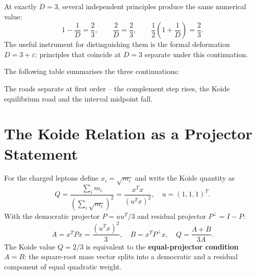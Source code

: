 At exactly \(D = 3\), several independent principles produce the same
numerical value:
\begin{equation}
  1 - \frac{1}{D} = \frac{2}{3}, \qquad
  \frac{2}{D} = \frac{2}{3}, \qquad
  \frac{1}{2}\!\left(1 + \frac{1}{D}\right) = \frac{2}{3}.
\end{equation}
The useful instrument for distinguishing them is the formal deformation
\(D = 3+\varepsilon\): principles that coincide at \(D = 3\) separate under
this continuation.

The following table summarises the three continuations:

\begin{center}
\renewcommand{\arraystretch}{1.5}
\end{center}

The roads separate at first order -- the complement step rises,
the Koide equilibrium road and the interval midpoint fall.

\section{The Koide Relation as a Projector Statement}

For the charged leptons define \(x_i = \sqrt{m_i}\) and write the Koide
quantity as
\begin{equation}
  Q = \frac{\sum_i m_i}{\left(\sum_i \sqrt{m_i}\right)^2}
    = \frac{x^Tx}{(u^Tx)^2},
  \quad u = (1,1,1)^T.
\end{equation}
With the democratic projector \(P = uu^T/3\) and residual projector
\(P^\perp = I - P\):
\[
  A = x^TPx = \frac{(u^Tx)^2}{3}, \quad B = x^TP^\perp x,
  \quad Q = \frac{A+B}{3A}.
\]
The Koide value \(Q = 2/3\) is equivalent to the
\textbf{equal-projector condition} \(A = B\):
the square-root mass vector splits into a democratic and a residual
component of equal quadratic weight.

